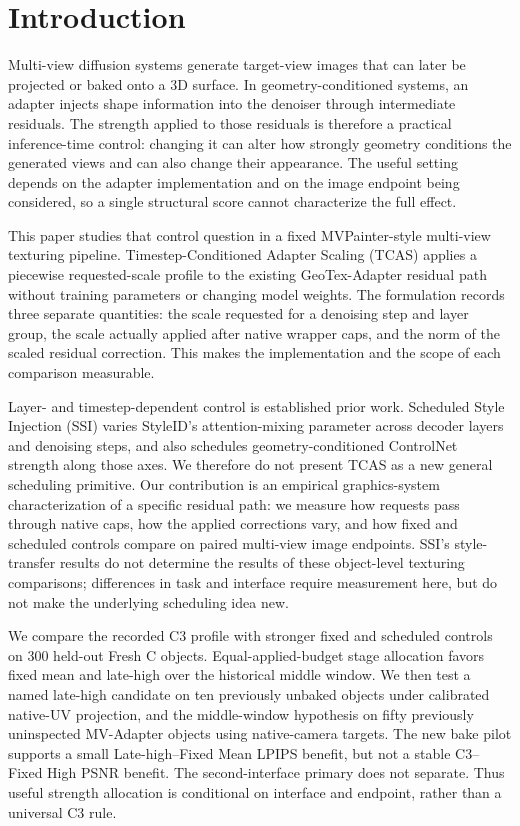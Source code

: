 \documentclass[times,twocolumn,final]{elsarticle}
\begin{document}
\linenumbers

\section{Introduction}
\label{sec:intro}

Multi-view diffusion systems generate target-view images that can later be projected or baked onto a 3D surface. In geometry-conditioned systems, an adapter injects shape information into the denoiser through intermediate residuals. The strength applied to those residuals is therefore a practical inference-time control: changing it can alter how strongly geometry conditions the generated views and can also change their appearance. The useful setting depends on the adapter implementation and on the image endpoint being considered, so a single structural score cannot characterize the full effect.

This paper studies that control question in a fixed MVPainter-style multi-view texturing pipeline. Timestep-Conditioned Adapter Scaling (TCAS) applies a piecewise requested-scale profile to the existing GeoTex-Adapter residual path without training parameters or changing model weights. The formulation records three separate quantities: the scale requested for a denoising step and layer group, the scale actually applied after native wrapper caps, and the norm of the scaled residual correction. This makes the implementation and the scope of each comparison measurable.

Layer- and timestep-dependent control is established prior work. Scheduled Style Injection (SSI) varies StyleID's attention-mixing parameter across decoder layers and denoising steps, and also schedules geometry-conditioned ControlNet strength along those axes. We therefore do not present TCAS as a new general scheduling primitive. Our contribution is an empirical graphics-system characterization of a specific residual path: we measure how requests pass through native caps, how the applied corrections vary, and how fixed and scheduled controls compare on paired multi-view image endpoints. SSI's style-transfer results do not determine the results of these object-level texturing comparisons; differences in task and interface require measurement here, but do not make the underlying scheduling idea new.

We compare the recorded C3 profile with stronger fixed and scheduled controls on 300 held-out Fresh C objects. Equal-applied-budget stage allocation favors fixed mean and late-high over the historical middle window. We then test a named late-high candidate on ten previously unbaked objects under calibrated native-UV projection, and the middle-window hypothesis on fifty previously uninspected MV-Adapter objects using native-camera targets. The new bake pilot supports a small Late-high--Fixed Mean LPIPS benefit, but not a stable C3--Fixed High PSNR benefit. The second-interface primary does not separate. Thus useful strength allocation is conditional on interface and endpoint, rather than a universal C3 rule.
\end{document}
